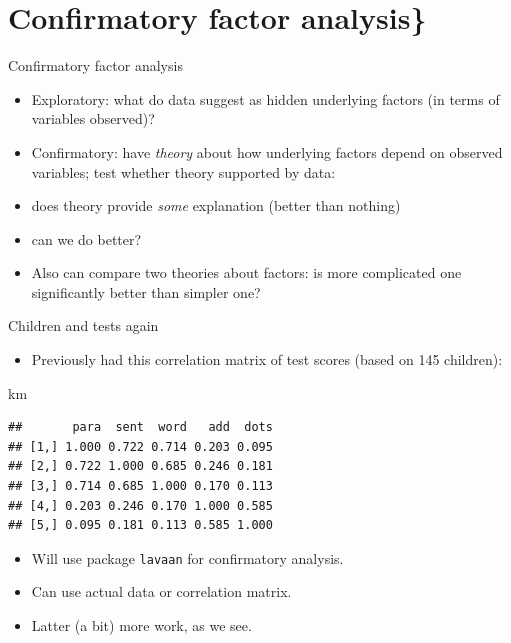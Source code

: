 \documentclass[ignorenonframetext,]{beamer}
\newenvironment{Shaded}{\begin{snugshade}}{\end{snugshade}}
\newcommand{\NormalTok}[1]{#1}
\providecommand{\tightlist}{%
  \setlength{\itemsep}{0pt}\setlength{\parskip}{0pt}}
\begin{document}
\hypertarget{confirmatory-factor-analysis}{%
\section{Confirmatory factor
analysis\}}\label{confirmatory-factor-analysis}}

\begin{frame}{Confirmatory factor analysis}
\protect\hypertarget{confirmatory-factor-analysis-1}{}

\begin{itemize}
\item
  Exploratory: what do data suggest as hidden underlying factors (in
  terms of variables observed)?
\item
  Confirmatory: have \emph{theory} about how underlying factors depend
  on observed variables; test whether theory supported by data:
\item
  does theory provide \emph{some} explanation (better than nothing)
\item
  can we do better?
\item
  Also can compare two theories about factors: is more complicated one
  significantly better than simpler one?
\end{itemize}

\end{frame}

\begin{frame}[fragile]{Children and tests again}
\protect\hypertarget{children-and-tests-again}{}

\begin{itemize}
\tightlist
\item
  Previously had this correlation matrix of test scores (based on 145
  children):
\end{itemize}

\begin{Shaded}
\begin{Highlighting}[]
\NormalTok{km}
\end{Highlighting}
\end{Shaded}

\begin{verbatim}
##       para  sent  word   add  dots
## [1,] 1.000 0.722 0.714 0.203 0.095
## [2,] 0.722 1.000 0.685 0.246 0.181
## [3,] 0.714 0.685 1.000 0.170 0.113
## [4,] 0.203 0.246 0.170 1.000 0.585
## [5,] 0.095 0.181 0.113 0.585 1.000
\end{verbatim}

\begin{itemize}
\item
  Will use package \texttt{lavaan} for confirmatory analysis.
\item
  Can use actual data or correlation matrix.
\item
  Latter (a bit) more work, as we see.
\end{itemize}

\end{frame}
\end{document}
